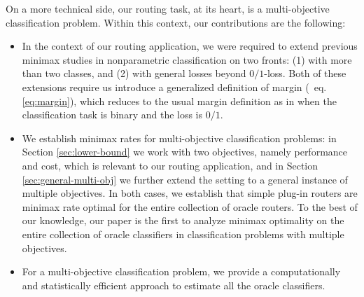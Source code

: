 On a more technical side, our routing task, at its heart, is a multi-objective classification problem. Within this context, our contributions are the following: 
\begin{itemize}
    \item In the context of our routing application, we were required to extend previous minimax studies in nonparametric classification \citep{audibert2007Fast} on two fronts: (1) with more than two classes, and (2)  with general losses beyond $0/1$-loss. Both of these extensions require us introduce a generalized definition of margin (\cf\ eq. \eqref{eq:margin}), which reduces to the usual margin definition as in \citet{audibert2007Fast} when the classification task is binary and the loss is $0/1$. 
    \item  We establish minimax rates for multi-objective classification problems: in Section \ref{sec:lower-bound} we work with two objectives, namely performance and cost, which is relevant to our routing application, and in Section \ref{sec:general-multi-obj} we further extend the setting to a general instance of multiple objectives. In both cases, we establish that simple plug-in routers are minimax rate optimal for the entire collection of oracle routers. To the best of our knowledge, our paper is the first to analyze minimax optimality on the entire collection of oracle classifiers in classification problems with multiple objectives. 
    \item  For a multi-objective classification problem, we provide a computationally and statistically efficient approach to estimate all the oracle classifiers.  
\end{itemize}













